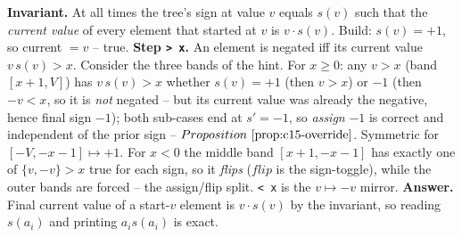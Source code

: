 \begin{proofbox}
\textbf{Invariant.} At all times the tree's sign at value \(v\) equals \(s(v)\) such that
the \emph{current value} of every element that started at \(v\) is \(v\cdot s(v)\). Build:
\(s(v)=+1\), so current \(=v\) -- true. \textbf{Step \texttt{> x}.} An element is negated
iff its current value \(v\,s(v)>x\). Consider the three bands of the hint. For \(x\ge0\):
any \(v>x\) (band \([x{+}1,V]\)) has \(v\,s(v)>x\) whether \(s(v)=+1\) (then \(v>x\)) or
\(-1\) (then \(-v<x\), so it is \emph{not} negated -- but its current value was already the
negative, hence final sign \(-1\)); both sub-cases end at \(s'=-1\), so \emph{assign}
\(-1\) is correct and independent of the prior sign -- \(\propref{c15-override}\). Symmetric
for \([-V,-x{-}1]\)\(\mapsto+1\). For \(x<0\) the middle band \([x{+}1,-x{-}1]\) has exactly
one of \(\{v,-v\}>x\) true for each sign, so it \emph{flips} (\(\mathit{flip}\) is the
sign-toggle), while the outer bands are forced -- the assign/flip split. \texttt{< x} is the
\(v\mapsto-v\) mirror. \textbf{Answer.} Final current value of a start-\(v\) element is
\(v\cdot s(v)\) by the invariant, so reading \(s(a_i)\) and printing \(a_i s(a_i)\) is exact.
\end{proofbox}

